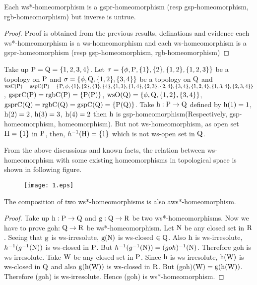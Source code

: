 \begin{thm}\label{thm5.2.20}
Each ws*-homeomorphism is a gspr-homeomorphism (resp gsp-homeomorphism, rgb-homeomorphism) but inverse is untrue.
\end{thm}

\begin{proof}
Proof is obtained from the previous results, definations and evidence each ws*-homeomorphism is a ws-homeomorphism and each ws-homeomorphism is a gspr-homeomorphism (resp gsp-homeomorphism, rgb-homeomorphism)
\end{proof}

\begin{exm}\label{exam5.2.21}
Take up $\mathrm{P}=\mathrm{Q}= \{1, 2, 3, 4\}$. Let $\tau= \{\phi, \TSP, \{1\}, \{2\}, \{1, 2\},\break \{1,2,3\}\}$ be a topology on $\mathrm{P}$ and $\sigma=\{\phi,\mathrm{Q},\{1,2\},\{3,4\}\}$ be a topology on $\mathrm{Q}$ and $\ws\TSC(\TSP)= \gsp\TSC(\TSP)=\{\TSP, \phi,\{1\},\{2\},\{3\},\{4\},\{1,3\},\{1,4\},\{2,3\},\{2,4\},\{3,4\},\break \{1,2,4\},\{1,3,4\},\{2,3,4\}\}$, $\mathrm{gspr}\mathrm{C}(\mathrm{P})=\mathrm{rgb}\mathrm{C}(\mathrm{P})=\{\mathrm{P}(\mathrm{P})\}$, $\ws\TSO(\TSQ)=\{\phi,\TSQ,\{1,2\},\break \{3,4\}\}$, $\mathrm{gspr}\mathrm{C}(\mathrm{Q})=\mathrm{rgb}\mathrm{C}(\mathrm{Q})=\mathrm{gsp}\mathrm{C}(\mathrm{Q})=\{\mathrm{P}(\mathrm{Q})\}$. Take $\mathrm{h}: \mathrm{P}\to \mathrm{Q}$ defined by $\mathrm{h}(1)=1$, $\mathrm{h}(2)= 2$, $\mathrm{h}(3)=3$, $\mathrm{h}(4)=2$ then $\mathrm{h}$ is gsp-homeomorphism(Respectively, gsp-homeomorphism, homeomorphism). But not ws-homeomorphism, as open set $\mathrm{H}= \{1\}$ in $\mathrm{P}$, then, $h^{-1} (\mathrm{H}) = \{1\}$ which is not ws-open set in $\mathrm{Q}$.
\end{exm}

\begin{rem}\label{rem5.2.22} 
From the above discussions and known facts, the relation between ws-homeomorphism with some existing homeomorphisms in topological space is shown in
following figure.
\begin{figure}[H]
\centering
\texttt{[image: 1.eps]}
\end{figure}
\end{rem}

\begin{thm}\label{thm5.2.23} 
The composition of two ws*-homeomorphisms is also a\break ws*-homeomor\-phism.
\end{thm}

\begin{proof}
Take up $\mathrm{h}: \mathrm{P}\to \mathrm{Q}$ and $\mathrm{g}: \mathrm{Q}\to \mathrm{R}$ be two ws*-homeomorphisms. Now we have to prove goh: $\mathrm{Q}\to \mathrm{R}$ be ws*-homeomorphism. Let $\mathrm{N}$ be any closed set in $\mathrm{R}$. Seeing that $\mathrm{g}$ is ws-irresolute, $\mathrm{g}(\mathrm{N})$ is ws-closed $\in \mathrm{Q}$. Also $\mathrm{h}$ is ws-irresolute, $h^{-1} (g^{-1} (\mathrm{N}))$ is ws-closed in $\mathrm{P}$. But $h^{-1} (g^{-1}(\mathrm{N}))= (goh)^{-1}(\mathrm{N})$. Therefore goh is ws-irresolute. Take $\mathrm{W}$ be any closed set in $\mathrm{P}$. Since $\mathrm{h}$ is ws-irresolute, $\mathrm{h}(\mathrm{W})$ is ws-closed in $\mathrm{Q}$ and also $\mathrm{g}(\mathrm{h}(\mathrm{W}))$ is ws-closed in $\mathrm{R}$. But (goh)$(\mathrm{W})=\mathrm{g}(\mathrm{h}(\mathrm{W}))$. Therefore (goh) is ws-irresolute. Hence (goh) is ws*-homeomorphism.
\end{proof}

